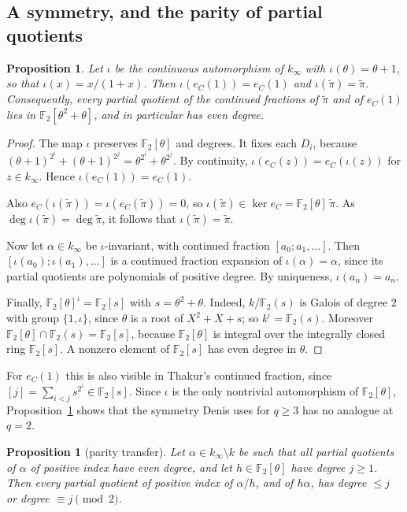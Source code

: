 \documentclass[11pt]{amsart}
\newtheorem{proposition}[theorem]{Proposition}
\theoremstyle{remark}
\numberwithin{equation}{section}
\newcommand{\F}{\mathbb{F}}
\newcommand{\kinf}{k_\infty}
\newcommand{\pit}{\tilde\pi}
\newcommand{\eC}{e_C}
\begin{document}
\subsection{A symmetry, and the parity of partial quotients}

\begin{proposition}\label{prop:iota}
Let $\iota$ be the continuous automorphism of $\kinf$ with $\iota(\theta)=\theta+1$, so that $\iota(x)=x/(1+x)$. Then $\iota(\eC(1))=\eC(1)$ and $\iota(\pit)=\pit$. Consequently, every partial quotient of the continued fractions of $\pit$ and of $\eC(1)$ lies in $\F_2[\theta^2+\theta]$, and in particular has even degree.
\end{proposition}

\begin{proof}
The map $\iota$ preserves $\F_2[\theta]$ and degrees. It fixes each $D_i$, because $(\theta+1)^{2^i}+(\theta+1)^{2^j}=\theta^{2^i}+\theta^{2^j}$. By continuity, $\iota(\eC(z))=\eC(\iota(z))$ for $z\in\kinf$. Hence $\iota(\eC(1))=\eC(1)$.

Also $\eC(\iota(\pit))=\iota(\eC(\pit))=0$, so $\iota(\pit)\in\ker\eC=\F_2[\theta]\,\pit$. As $\deg\iota(\pit)=\deg\pit$, it follows that $\iota(\pit)=\pit$.

Now let $\alpha\in\kinf$ be $\iota$-invariant, with continued fraction $[a_0;a_1,\dots]$. Then $[\iota(a_0);\iota(a_1),\dots]$ is a continued fraction expansion of $\iota(\alpha)=\alpha$, since its partial quotients are polynomials of positive degree. By uniqueness, $\iota(a_n)=a_n$.

Finally, $\F_2[\theta]^\iota=\F_2[s]$ with $s=\theta^2+\theta$. Indeed, $k/\F_2(s)$ is Galois of degree $2$ with group $\{1,\iota\}$, since $\theta$ is a root of $X^2+X+s$; so $k^\iota=\F_2(s)$. Moreover $\F_2[\theta]\cap\F_2(s)=\F_2[s]$, because $\F_2[\theta]$ is integral over the integrally closed ring $\F_2[s]$. A nonzero element of $\F_2[s]$ has even degree in $\theta$.
\end{proof}

For $\eC(1)$ this is also visible in Thakur's continued fraction, since $[j]=\sum_{i<j}s^{2^i}\in\F_2[s]$. Since $\iota$ is the only nontrivial automorphism of $\F_2[\theta]$, Proposition~\ref{prop:iota} shows that the symmetry Denis uses for $q\ge3$ has no analogue at $q=2$.

\begin{proposition}[parity transfer]\label{prop:parity}
Let $\alpha\in\kinf\setminus k$ be such that all partial quotients of $\alpha$ of positive index have even degree, and let $h\in\F_2[\theta]$ have degree $j\ge1$. Then every partial quotient of positive index of $\alpha/h$, and of $h\alpha$, has degree $\le j$ or degree $\equiv j\pmod 2$.
\end{proposition}
\end{document}
